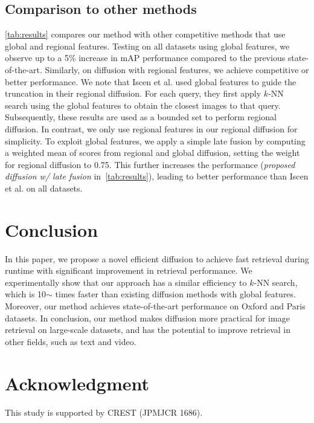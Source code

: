 \documentclass[letterpaper]{article} \usepackage{aaai19}  \usepackage{times}  \usepackage{helvet}  \usepackage{courier}  \usepackage{url}  \usepackage{graphicx}  \frenchspacing  \setlength{\pdfpagewidth}{8.5in}  \setlength{\pdfpageheight}{11in}
\begin{document}
\subsection{Comparison to other methods}
\cref{tab:results} compares our method with other competitive methods that use global and regional features. Testing on all datasets using global features, we observe up to a 5\% increase in mAP performance compared to the previous state-of-the-art. Similarly, on diffusion with regional features, we achieve competitive or better performance.
We note that Iscen et al. used global features to guide the truncation in their regional diffusion.
For each query, they first apply $k$-NN search using the global features to obtain the closest images to that query.
Subsequently, these results are used as a bounded set to perform regional diffusion.
In contrast, we only use regional features in our regional diffusion for simplicity.
To exploit global features, we apply a simple late fusion by computing a weighted mean of scores from regional and global diffusion, setting the weight for regional diffusion to 0.75.
This further increases the performance (\textit{proposed diffusion w/ late fusion} in~\cref{tab:results}), leading to better performance than Iscen et al. on all datasets.


\section{Conclusion}

In this paper, we propose a novel efficient diffusion to achieve fast retrieval during runtime with significant improvement in retrieval performance.
We experimentally show that our approach has a similar efficiency to $k$-NN search, which is 10$\sim$ times faster than existing diffusion methods with global features.
Moreover, our method achieves state-of-the-art performance on Oxford and Paris datasets.
In conclusion, our method makes diffusion more practical for image retrieval on large-scale datasets, and has the potential to improve retrieval in other fields, such as text and video.

\section{Acknowledgment}

This study is supported by CREST (JPMJCR 1686).

\clearpage



\end{document}
